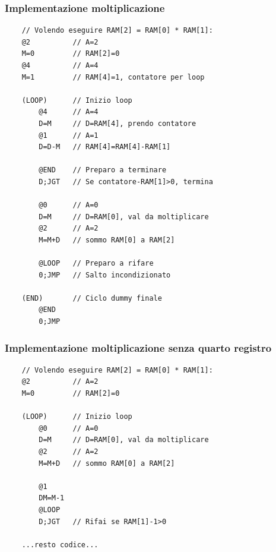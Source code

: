 \documentclass[12pt]{article}
\begin{document}
\subsubsection{Implementazione moltiplicazione}
\begin{lstlisting}
    // Volendo eseguire RAM[2] = RAM[0] * RAM[1]:
    @2          // A=2
    M=0         // RAM[2]=0
    @4          // A=4
    M=1         // RAM[4]=1, contatore per loop

    (LOOP)      // Inizio loop
        @4      // A=4
        D=M     // D=RAM[4], prendo contatore
        @1      // A=1 
        D=D-M   // RAM[4]=RAM[4]-RAM[1]
        
        @END    // Preparo a terminare
        D;JGT   // Se contatore-RAM[1]>0, termina

        @0      // A=0
        D=M     // D=RAM[0], val da moltiplicare
        @2      // A=2
        M=M+D   // sommo RAM[0] a RAM[2]

        @LOOP   // Preparo a rifare
        0;JMP   // Salto incondizionato
    
    (END)       // Ciclo dummy finale
        @END
        0;JMP
\end{lstlisting}

\subsubsection{Implementazione moltiplicazione senza quarto registro}
\begin{lstlisting}
    // Volendo eseguire RAM[2] = RAM[0] * RAM[1]:
    @2          // A=2
    M=0         // RAM[2]=0
    
    (LOOP)      // Inizio loop
        @0      // A=0
        D=M     // D=RAM[0], val da moltiplicare
        @2      // A=2
        M=M+D   // sommo RAM[0] a RAM[2]

        @1
        DM=M-1
        @LOOP
        D;JGT   // Rifai se RAM[1]-1>0
    
    ...resto codice...
\end{lstlisting}
\end{document}
